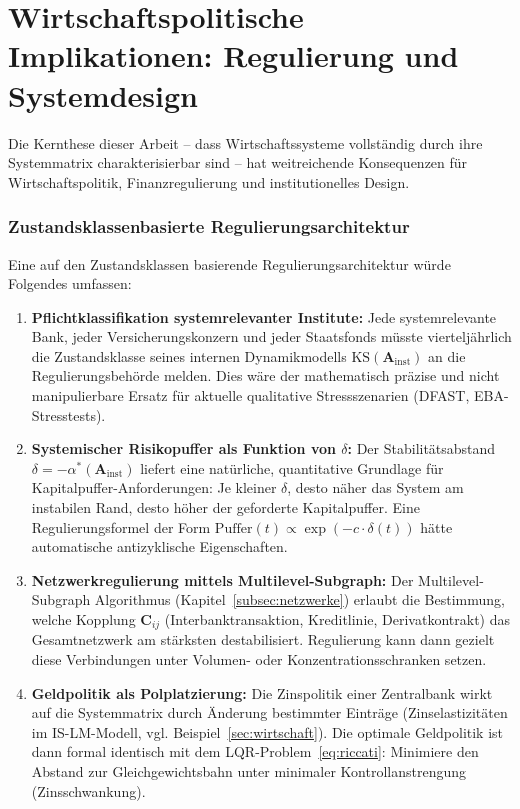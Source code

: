 ﻿\documentclass[12pt, a4paper, titlepage]{report}
\theoremstyle{definition}
\theoremstyle{remark}
\newcommand{\vA}{\bm{A}}
\newcommand{\vC}{\bm{C}}
\newcommand{\KS}{\mathrm{KS}}
\begin{document}
\section{Wirtschaftspolitische Implikationen: Regulierung und Systemdesign}
\label{subsec:wirtschaftspolitik}

Die Kernthese dieser Arbeit -- dass Wirtschaftssysteme vollständig durch
ihre Systemmatrix charakterisierbar sind -- hat weitreichende Konsequenzen für
Wirtschaftspolitik, Finanzregulierung und institutionelles Design.

\subsubsection*{Zustandsklassenbasierte Regulierungsarchitektur}

Eine auf den Zustandsklassen basierende Regulierungsarchitektur würde Folgendes umfassen:

\begin{enumerate}[label=\textbf{R\arabic*.}]
  \item \textbf{Pflichtklassifikation systemrelevanter Institute:}
    Jede systemrelevante Bank, jeder Versicherungskonzern und jeder Staatsfonds
    müsste vierteljährlich die Zustandsklasse seines internen Dynamikmodells
    $\KS(\vA_{\mathrm{inst}})$ an die Regulierungsbehörde melden. Dies wäre der
    mathematisch präzise und nicht manipulierbare Ersatz für aktuelle
    qualitative Stressszenarien (DFAST, EBA-Stresstests).

  \item \textbf{Systemischer Risikopuffer als Funktion von $\delta$:}
    Der Stabilitätsabstand $\delta = -\alpha^*(\vA_{\mathrm{inst}})$ liefert
    eine natürliche, quantitative Grundlage für Kapitalpuffer-Anfor\-derungen:
    Je kleiner $\delta$, desto näher das System am instabilen Rand, desto
    höher der geforderte Kapitalpuffer. Eine Regulierungs\-formel der Form
    $\mathrm{Puffer}(t) \propto \exp(-c \cdot \delta(t))$ hätte automatische
    antizyklische Eigenschaften.

  \item \textbf{Netzwerkregulierung mittels Multilevel-Subgraph:}
    Der Multilevel-Subgraph Algorithmus (Kapitel~\ref{subsec:netzwerke}) erlaubt
    die Bestimmung, welche Kopplung $\vC_{ij}$ (Interbanktransaktion, Kreditlinie,
    Derivatkontrakt) das Gesamtnetzwerk am stärksten destabilisiert. Regulierung
    kann dann gezielt diese Verbindungen unter Volumen- oder Konzentrationsschranken
    setzen.

  \item \textbf{Geldpolitik als Polplatzierung:}
    Die Zinspolitik einer Zentralbank wirkt auf die Systemmatrix durch
    Änderung bestimmter Einträge (Zinselastizitäten im IS-LM-Modell, vgl.
    Beispiel~\ref{sec:wirtschaft}). Die optimale Geldpolitik ist dann formal
    identisch mit dem LQR-Problem~\eqref{eq:riccati}: Minimiere den Abstand
    zur Gleichgewichtsbahn unter minimaler Kontrollanstrengung (Zinsschwankung).
\end{enumerate}
\end{document}
